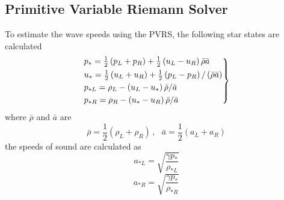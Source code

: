 
\subsection{Primitive Variable Riemann Solver}\label{sect:PVRS}

To estimate the wave speeds using the PVRS, the following star states are calculated
\begin{equation}\label{eq:PVRS}
	\begin{rcases}
		p_* = \frac{1}{2} \left(p_L + p_R\right) + \frac{1}{2} \left(u_L - u_R\right) \bar{\rho} \bar{a}\\
		u_* = \frac{1}{2} \left(u_L + u_R\right) + \frac{1}{2} \left(p_L - p_R\right) / \left(\bar{\rho} \bar{a}\right)\\
		p_{*L} = \rho_L - \left(u_L - u_*\right)\bar{\rho} / \bar{a}\\
		p_{*R} = \rho_R - \left(u_* - u_R\right)\bar{\rho} / \bar{a}
	\end{rcases}
\end{equation}
where $\bar{\rho}$ and $\bar{a}$ are
\begin{equation}
	\bar{\rho} = \frac{1}{2} \left(\rho_L + \rho_R\right) \, , \,\,\,\, \bar{a} = \frac{1}{2} \left(a_L + a_R\right)
\end{equation}
the speeds of sound are calculated as
\begin{equation}
	a_{*L} = \sqrt{\frac{\gamma p_*}{\rho_{*L}}}
\end{equation}
\begin{equation}
	a_{*R} = \sqrt{\frac{\gamma p_*}{\rho_{*R}}}
\end{equation}
